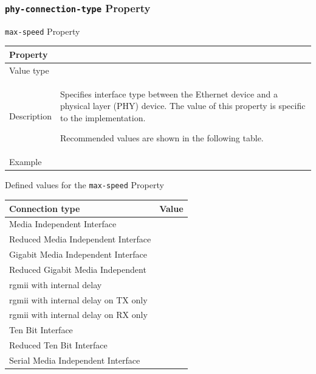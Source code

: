 \documentclass[a4paper,10pt,oneside]{sphinxmanual}
\begin{document}
\subsubsection{\texttt{phy-connection-type} Property}
\label{device-bindings:phy-connection-type-property}

\begin{threeparttable}
\capstart\caption{\texttt{max-speed} Property}\label{device-bindings:id13}
\begin{tabulary}{\linewidth}{l J}
\hline
\textsf{\relax 
Property
} & \textsf{\relax 
{}
}\\
\hline
Value type
 & 
\\
\hline
Description
 & 
Specifies interface type between the Ethernet device and a
physical layer (PHY) device. The value of this property is
specific to the implementation.

Recommended values are shown in the following table.
\\
\hline
Example
 & 
\\
\hline\end{tabulary}

\end{threeparttable}



\begin{threeparttable}
\capstart\caption{Defined values for the \texttt{max-speed} Property}\label{device-bindings:id14}
\begin{tabulary}{\linewidth}{l J}
\hline
\textsf{\relax 
Connection type
} & \textsf{\relax 
Value
}\\
\hline
Media Independent Interface
 & 
\\
\hline
Reduced Media Independent Interface
 & 
\\
\hline
Gigabit Media Independent Interface
 & 
\\
\hline
Reduced Gigabit Media Independent
 & 
\\
\hline
rgmii with internal delay
 & 
\\
\hline
rgmii with internal delay on TX only
 & 
\\
\hline
rgmii with internal delay on RX only
 & 
\\
\hline
Ten Bit Interface
 & 
\\
\hline
Reduced Ten Bit Interface
 & 
\\
\hline
Serial Media Independent Interface
 & 
\\
\hline\end{tabulary}

\end{threeparttable}
\end{document}
